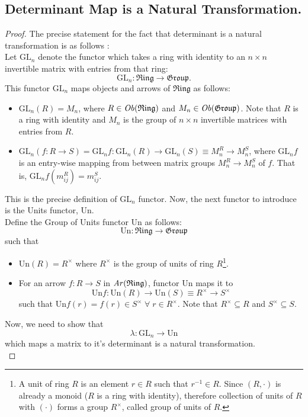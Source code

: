 \documentclass{article}
\theoremstyle{definition}
\theoremstyle{remark}
\theoremstyle{definition}
\theoremstyle{definition}
\theoremstyle{definition}
\newcommand{\inv}[1]{#1^{-1}}
\newcommand{\cat}[1]{\mathfrak{#1}}
\newcommand{\obj}[1]{\text{\textit{Ob}}(#1)}
\newcommand{\arr}[1]{\text{\textit{Ar}}(#1)}
\newcommand{\GL}[1]{\text{GL}_{#1}}
\newcommand{\Un}{\text{Un}}
\begin{document}
\subsection{Determinant Map is a Natural Transformation.}
\label{PROOF-3} \begin{proof}
	The precise statement for the fact that determinant is a natural transformation is as follows :\\
Let $ \GL{n} $ denote the functor which takes a ring with identity to an $ n\times n $ invertible matrix with entries from that ring:
\[\GL{n} : \cat{Ring} \longrightarrow \cat{Group}.\]
This functor $ \GL{n} $ maps objects and arrows of $ \cat{Ring} $ as follows:
\begin{itemize}
	\item {$ \GL{n}(R) = M_n $, where $ R\in \obj{\cat{Ring}} $ and $ M_n\in \obj{\cat{Group}} $. Note that $ R $ is a ring with identity and $ M_n $ is the group of $ n\times n $ invertible matrices with entries from $ R $.}
	\item {$ \GL{n}(f:R\to S) = \GL{n}f : \GL{n}(R) \to \GL{n}(S) \equiv M_n^{R} \to M_n^{S} $, where $ \GL{n}f $ is an entry-wise mapping from between matrix groups $ M_n^{R} \to M_n^{S} $ of $ f $. That is, $ \GL{n} f(m_{ij}^{R}) = m_{ij}^{S}$.}
\end{itemize}
This is the precise definition of $ \GL{n} $ functor. Now, the next functor to introduce is the Units functor, $ \Un $.\\
Define the Group of Units functor $ \Un $ as follows:
\[\Un : \cat{Ring} \longrightarrow \cat{Group}\]
such that 
\begin{itemize}
	\item {$ \Un(R) = R^{\times} $ where $ R^{\times} $ is the group of units of ring $ R $\footnote{A unit of ring $ R $ is an element $ r\in R $ such that $ \inv{r}\in R$. Since $ (R,\cdot) $ is already a monoid ($ R $ is a ring with identity), therefore collection of units of $ R $ with $ (\cdot ) $ forms a group $ R^{\times} $, called group of units of $ R $.}.}
	\item {For an arrow $ f: R\to  S$ in $ \arr{\cat{Ring}} $, functor $ \Un $ maps it to
\[\Un f : \Un(R) \longrightarrow \Un(S) \equiv R^{\times} \longrightarrow S^{\times}\]
	such that $ \Un f(r) = f(r) \in S^{\times} \;\forall\;r\in R^{\times}$. Note that $ R^{\times} \subseteq R $ and $ S^{\times} \subseteq S $. 
}
\end{itemize}
Now, we need to show that 
\[\lambda : \GL{n} \longrightarrow \Un\]
which maps a matrix to it's determinant is a natural transformation.\\

\end{proof}
\end{document}
